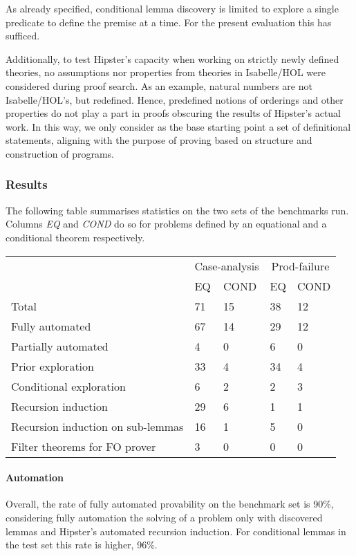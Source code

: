 As already specified, conditional lemma discovery is limited to explore a single predicate to define the premise at a time. For the present evaluation this has sufficed.

Additionally, to test Hipster's capacity when working on strictly newly defined theories, no assumptions nor properties from theories in Isabelle/HOL were considered during proof search.
%
As an example, natural numbers are not Isabelle/HOL's, but redefined.
%
Hence, predefined notions of orderings and other properties do not play a part in proofs obscuring the results of Hipster's actual work.
%
In this way, we only consider as the base starting point a set of definitional statements, aligning with the purpose of proving based on structure and construction of programs.

\subsubsection{Results}

The following table summarises statistics on the two sets of the benchmarks run.
%
Columns \emph{EQ} and \emph{COND} do so for problems defined by an equational and a conditional theorem respectively.

\begin{tabularx}{\textwidth}{l | X X | X X}
  & \multicolumn{2}{c|}{Case-analysis} & \multicolumn{2}{c}{Prod-failure} \\
  &  EQ & COND & EQ & COND \\
  \hline
  Total & 71 & 15 & 38 & 12 \\
  \hline
  Fully automated & 67 & 14 & 29 & 12 \\
  Partially automated & 4 & 0 & 6 & 0 \\
  \hline
  Prior exploration & 33 & 4 & 34 & 4 \\
  Conditional exploration & 6 & 2 & 2 & 3 \\
  \hline
  Recursion induction & 29 & 6 & 1 & 1 \\
  Recursion induction on sub-lemmas & 16 & 1 & 5 & 0 \\
  \hline
  Filter theorems for FO prover & 3 & 0 & 0 & 0 \\ %
\end{tabularx}

\paragraph{Automation}
%
Overall, the rate of fully automated provability on the benchmark set is 90\%, considering fully automation the solving of a problem only with discovered lemmas and Hipster's automated recursion induction.
%
For conditional lemmas in the test set this rate is higher, 96\%.

